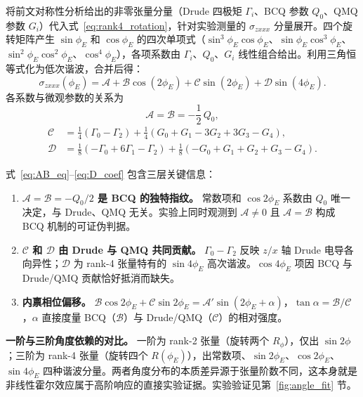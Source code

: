 将前文对称性分析给出的非零张量分量（Drude 四极矩 \(\Gamma_i\)、BCQ 参数 \(Q_0\)、QMQ 参数 \(G_i\)）代入式~\eqref{eq:rank4_rotation}，针对实验测量的 \(\sigma_{zxxx}\) 分量展开。四个旋转矩阵产生 \(\sin\phi_E\) 和 \(\cos\phi_E\) 的四次单项式（\(\sin^3\phi_E\cos\phi_E\)、\(\sin\phi_E\cos^3\phi_E\)、\(\sin^2\phi_E\cos^2\phi_E\)、\(\cos^4\phi_E\)），各项系数由 \(\Gamma_i\)、\(Q_0\)、\(G_i\) 线性组合给出。利用三角恒等式化为低次谐波，合并后得：
\begin{equation}
  \sigma_{zxxx}(\phi_E) = \mathcal{A} + \mathcal{B}\cos(2\phi_E) + \mathcal{C}\sin(2\phi_E) + \mathcal{D}\sin(4\phi_E).
  \label{eq:sigma_angle_expand}
\end{equation}
各系数与微观参数的关系为
\begin{equation}
  \mathcal{A} = \mathcal{B} = -\frac{1}{2}\,Q_0,
  \label{eq:AB_eq}
\end{equation}
\begin{align}
  \mathcal{C} &= \frac{1}{4}(\Gamma_0 - \Gamma_2) + \frac{1}{4}(G_0 + G_1 - 3G_2 + 3G_3 - G_4), \label{eq:C_coef}\\
  \mathcal{D} &= \frac{1}{8}(-\Gamma_0 + 6\Gamma_1 - \Gamma_2) + \frac{1}{8}(-G_0 + G_1 + G_2 + G_3 - G_4). \label{eq:D_coef}
\end{align}

式~\eqref{eq:AB_eq}--\eqref{eq:D_coef} 包含三层关键信息：
\begin{enumerate}
  \item \textbf{\(\mathcal{A}=\mathcal{B}=-Q_0/2\) 是 BCQ 的独特指纹。} 常数项和 \(\cos 2\phi_E\) 系数由 \(Q_0\) 唯一决定，与 Drude、QMQ 无关。实验上同时观测到 \(\mathcal{A}\neq 0\) 且 \(\mathcal{A}=\mathcal{B}\) 构成 BCQ 机制的可证伪判据。
  \item \textbf{\(\mathcal{C}\) 和 \(\mathcal{D}\) 由 Drude 与 QMQ 共同贡献。} \(\Gamma_0-\Gamma_2\) 反映 \(z/x\) 轴 Drude 电导各向异性；\(\mathcal{D}\) 为 rank-4 张量特有的 \(\sin 4\phi_E\) 高次谐波。\(\cos 4\phi_E\) 项因 BCQ 与 Drude/QMQ 贡献恰好抵消而缺失。
  \item \textbf{内禀相位偏移。} \(\mathcal{B}\cos 2\phi_E + \mathcal{C}\sin 2\phi_E = \mathcal{A}'\sin(2\phi_E + \alpha)\)，\(\tan\alpha = \mathcal{B}/\mathcal{C}\)，\(\alpha\) 直接度量 BCQ（\(\mathcal{B}\)）与 Drude/QMQ（\(\mathcal{C}\)）的相对强度。
\end{enumerate}

\textbf{一阶与三阶角度依赖的对比。} 一阶为 rank-2 张量（旋转两个 \(R_\phi\)），仅出 \(\sin 2\phi\)；三阶为 rank-4 张量（旋转四个 \(R(\phi_E)\)），出常数项、\(\sin 2\phi_E\)、\(\cos 2\phi_E\)、\(\sin 4\phi_E\) 四种谐波分量。两者角度分布的本质差异源于张量阶数不同，这本身就是非线性霍尔效应属于高阶响应的直接实验证据。实验验证见第~\ref{fig:angle_fit} 节。